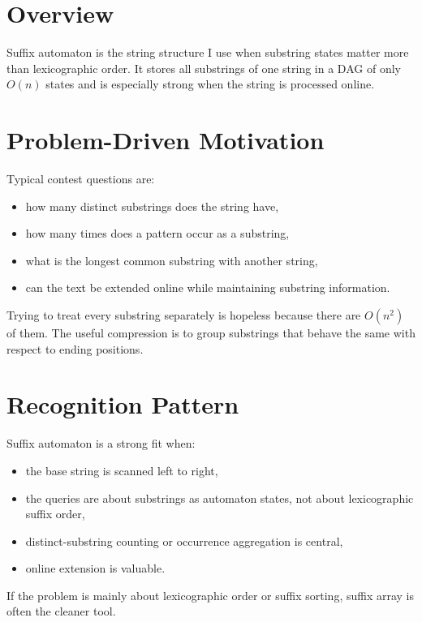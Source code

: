 \section*{Overview}

Suffix automaton is the string structure I use when substring states matter more than lexicographic order. It stores all
substrings of one string in a DAG of only \(O(n)\) states and is especially strong when the string is processed online.

\section*{Problem-Driven Motivation}

Typical contest questions are:

\begin{itemize}
  \item how many distinct substrings does the string have,
  \item how many times does a pattern occur as a substring,
  \item what is the longest common substring with another string,
  \item can the text be extended online while maintaining substring information.
\end{itemize}

Trying to treat every substring separately is hopeless because there are \(O(n^2)\) of them. The useful compression is
to group substrings that behave the same with respect to ending positions.

\section*{Recognition Pattern}

Suffix automaton is a strong fit when:

\begin{itemize}
  \item the base string is scanned left to right,
  \item the queries are about substrings as automaton states, not about lexicographic suffix order,
  \item distinct-substring counting or occurrence aggregation is central,
  \item online extension is valuable.
\end{itemize}

If the problem is mainly about lexicographic order or suffix sorting, suffix array is often the cleaner tool.

